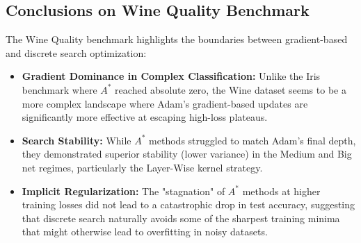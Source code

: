 \subsection{Conclusions on Wine Quality Benchmark}

The Wine Quality benchmark highlights the boundaries between gradient-based and discrete search optimization:

\begin{itemize}
    \item \textbf{Gradient Dominance in Complex Classification:} Unlike the Iris benchmark where $A^*$ reached absolute zero, the Wine dataset seems to be a more complex landscape where Adam’s gradient-based updates are significantly more effective at escaping high-loss plateaus.
    \item \textbf{Search Stability:} While $A^*$ methods struggled to match Adam's final depth, they demonstrated superior stability (lower variance) in the Medium and Big net regimes, particularly the Layer-Wise kernel strategy.
    \item \textbf{Implicit Regularization:} The "stagnation" of $A^*$ methods at higher training losses did not lead to a catastrophic drop in test accuracy, suggesting that discrete search naturally avoids some of the sharpest training minima that might otherwise lead to overfitting in noisy datasets.
\end{itemize}